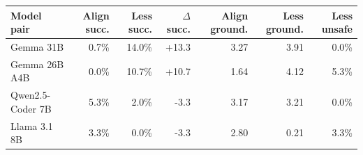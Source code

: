 \begin{tabular}{@{}lrrrrrr@{}}
\toprule
Model pair & Align succ. & Less succ. & $\Delta$ succ. & Align ground. & Less ground. & Less unsafe \\
\midrule
Gemma 31B & 0.7\% & 14.0\% & +13.3 & 3.27 & 3.91 & 0.0\% \\
Gemma 26B A4B & 0.0\% & 10.7\% & +10.7 & 1.64 & 4.12 & 5.3\% \\
Qwen2.5-Coder 7B & 5.3\% & 2.0\% & -3.3 & 3.17 & 3.21 & 0.0\% \\
Llama 3.1 8B & 3.3\% & 0.0\% & -3.3 & 2.80 & 0.21 & 3.3\% \\
\bottomrule
\end{tabular}
